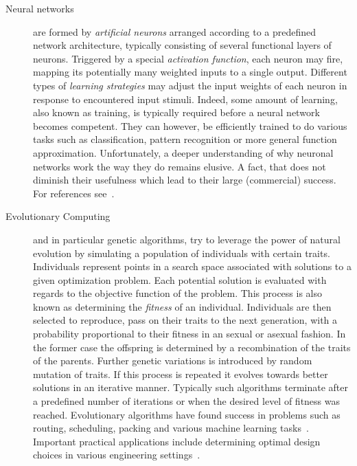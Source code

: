 		\begin{description}
			
			\item[Neural networks] are formed by \emph{artificial neurons} arranged according to a predefined network architecture, typically consisting of several functional layers of neurons. Triggered by a special \emph{activation function}, each neuron may fire, \ie mapping its potentially many weighted inputs to a single output. Different types of \emph{learning strategies} may adjust the input weights of each neuron in response to encountered input stimuli. Indeed, some amount of learning, also known as training, is typically required before a neural network becomes competent. They can however, be efficiently trained to do various tasks such as classification, pattern recognition or more general function approximation. Unfortunately, a deeper understanding of why neuronal networks work the way they do remains elusive. A fact, that does not diminish their usefulness which lead to their large (commercial) success. For references see~\cite{Haykin:1998:NNC:521706,Fausett:1994:FNN:197023,Bishop:1995:NNP:525960}.

			\item[Evolutionary Computing] and in particular genetic algorithms, try to leverage the power of natural evolution by simulating a population of individuals with certain traits. Individuals represent points in a search space associated with solutions to a given optimization problem. Each potential solution is evaluated with regards to the objective function of the problem. This process is also known as determining the \emph{fitness} of an individual. Individuals are then selected to reproduce, \ie pass on their traits to the next generation, with a probability proportional to their fitness in an sexual or asexual fashion. In the former case the offspring is determined by a recombination of the traits of the parents. Further genetic variations is introduced by random mutation of traits. If this process is repeated it evolves towards better solutions in an iterative manner. Typically such algorithms terminate after a predefined number of iterations or when the desired level of fitness was reached. Evolutionary algorithms have found success in problems such as routing, scheduling, packing and various machine learning tasks~\cite{Back:1997:HEC:548530,spears1993overview,zitzler2000comparison}. Important practical applications include determining optimal design choices in various engineering settings~\cite{Schwefel:1993:EOS:529401,kicinger2005evolutionary}.


\end{description}

